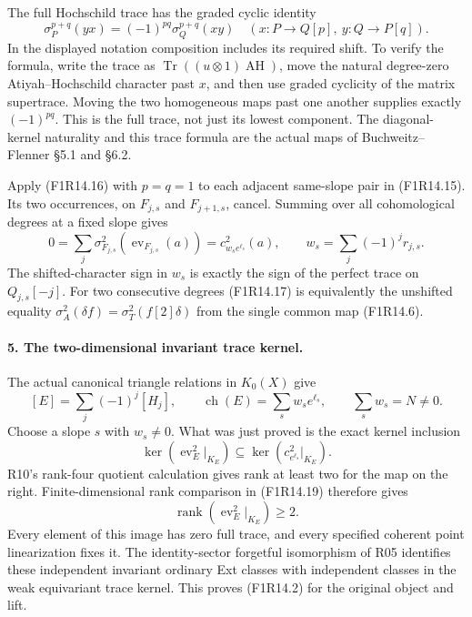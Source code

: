 The full Hochschild trace has the graded cyclic identity
\[
 \sigma_{P}^{p+q}(yx)
            =(-1)^{pq}\sigma_{Q}^{p+q}(xy)
 \quad(x:P\to Q[p],\ y:Q\to P[q]).
 \tag{F1R14.16}
\]
In the displayed notation composition includes its
required shift. To verify the formula, write the trace
as $\operatorname{Tr}((u\otimes1)\operatorname{AH})$,
move the natural degree-zero Atiyah--Hochschild character
past $x$, and then use graded cyclicity of the matrix
supertrace. Moving the two homogeneous maps past one
another supplies exactly $(-1)^{pq}$. This is the full
trace, not just its lowest component. The diagonal-kernel
naturality and this trace formula are the actual maps
of Buchweitz--Flenner \S5.1 and \S6.2.

Apply (F1R14.16) with $p=q=1$ to each adjacent same-slope
pair in (F1R14.15). Its two occurrences, on $F_{j,s}$
and $F_{j+1,s}$, cancel. Summing over all cohomological
degrees at a fixed slope gives
\[
 0=\sum_j\sigma^2_{F_{j,s}}
                    (\operatorname{ev}_{F_{j,s}}(a))
   =c^2_{w_s e^{\ell_s}}(a),\qquad
                 w_s=\sum_j(-1)^j r_{j,s}.
 \tag{F1R14.17}
\]
The shifted-character sign in $w_s$ is exactly the sign
of the perfect trace on $Q_{j,s}[-j]$. For two consecutive
degrees (F1R14.17) is equivalently the unshifted equality
$\sigma_A^2(\delta f)=\sigma_T^2(f[2]\delta)$ from the
single common map (F1R14.6).

\paragraph{5. The two-dimensional invariant trace kernel.}
The actual canonical triangle relations in $K_0(X)$ give
\[
                 [E]=\sum_j(-1)^j[H_j],\qquad
             \operatorname{ch}(E)=\sum_s w_s e^{\ell_s},
                         \qquad\sum_s w_s=N\ne0.
 \tag{F1R14.18}
\]
Choose a slope $s$ with $w_s\ne0$. What was just proved
is the exact kernel inclusion
\[
 \ker\left(\operatorname{ev}_E^2|_{K_E}\right)
       \subseteq
             \ker\left(c^2_{e^{\ell_s}}|_{K_E}\right).
 \tag{F1R14.19}
\]
R10's rank-four quotient calculation gives rank at least
two for the map on the right. Finite-dimensional rank
comparison in (F1R14.19) therefore gives
\[
                \operatorname{rank}
                    (\operatorname{ev}_E^2|_{K_E})\ge2.
 \tag{F1R14.20}
\]
Every element of this image has zero full trace, and
every specified coherent point linearization fixes it.
The identity-sector forgetful isomorphism of R05 identifies
these independent invariant ordinary Ext classes with
independent classes in the weak equivariant trace kernel.
This proves (F1R14.2) for the original object and lift.

